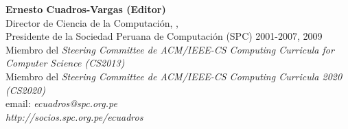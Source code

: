 \noindent \textbf{Ernesto Cuadros-Vargas (Editor)}\\ 
Director de Ciencia de la Computación, \University, \city\\
Presidente de la Sociedad Peruana de Computación (SPC) 2001-2007, 2009\\
Miembro del {\it Steering Committee de ACM/IEEE-CS Computing Curricula for Computer Science (CS2013)}\\
Miembro del {\it Steering Committee de ACM/IEEE-CS Computing Curricula 2020 (CS2020)}\\
email: \textit{ecuadros@spc.org.pe}\\
\textit{http://socios.spc.org.pe/ecuadros}

